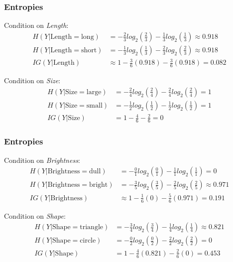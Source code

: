 \documentclass[aspectratio=169, 10pt]{beamer}
\begin{document}
\begin{frame}
    \frametitle{Entropies}
    \small

    Condition on \textit{Length}:
    \[
        \begin{split}
            H(Y|\text{Length}=\text{long}) & = -\frac{2}{3} log_2(\frac{2}{3}) -\frac{1}{3} log_2(\frac{1}{3}) \approx 0.918 \\
            H(Y|\text{Length}=\text{short}) & = -\frac{1}{3} log_2(\frac{1}{3}) -\frac{2}{3} log_2(\frac{2}{3}) \approx 0.918 \\
            IG(Y|\text{Length}) & \approx 1 - \frac{3}{6}(0.918) - \frac{3}{6}(0.918) = 0.082
        \end{split}
    \]

    Condition on \textit{Size}:
    \[
        \begin{split}
            H(Y|\text{Size}=\text{large}) & = -\frac{2}{4} log_2(\frac{2}{4}) -\frac{2}{4} log_2(\frac{2}{4}) = 1 \\
            H(Y|\text{Size}=\text{small}) & = -\frac{1}{2} log_2(\frac{1}{2}) -\frac{1}{2} log_2(\frac{1}{2}) = 1 \\
            IG(Y|\text{Size}) & = 1 - \frac{4}{6} - \frac{2}{6} = 0
        \end{split}
    \]

\end{frame}

\begin{frame}
    \frametitle{Entropies}
    \small

    Condition on \textit{Brightness}:
    \[
        \begin{split}
            H(Y|\text{Brightness}=\text{dull}) & = -\frac{0}{1} log_2(\frac{0}{1}) -\frac{1}{1} log_2(\frac{1}{1}) = 0 \\
            H(Y|\text{Brightness}=\text{bright}) & = -\frac{3}{5} log_2(\frac{3}{5}) -\frac{2}{5} log_2(\frac{2}{5}) \approx 0.971 \\
            IG(Y|\text{Brightness}) & \approx 1 - \frac{1}{6}(0) -\frac{5}{6}(0.971) = 0.191
        \end{split}
    \]

    Condition on \textit{Shape}:
    \[
        \begin{split}
            H(Y|\text{Shape}=\text{triangle}) & = -\frac{3}{4} log_2(\frac{3}{4}) -\frac{1}{4} log_2(\frac{1}{4}) \approx 0.821 \\
            H(Y|\text{Shape}=\text{circle}) & = -\frac{0}{2} log_2(\frac{0}{2}) -\frac{2}{2} log_2(\frac{2}{2}) = 0 \\
            IG(Y|\text{Shape}) & = 1 - \frac{4}{6}(0.821) - \frac{2}{6}(0) = 0.453
        \end{split}
    \]
    
\end{frame}
\end{document}
